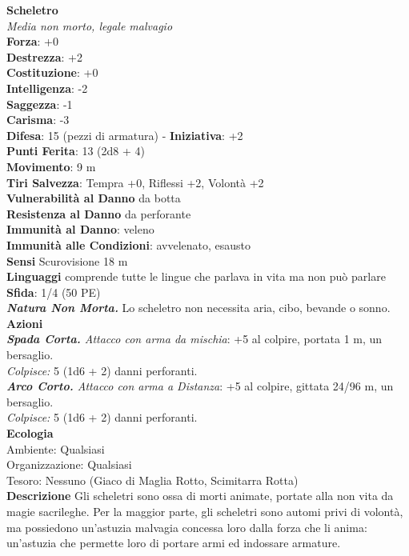 \begin{multicols}{2}
\medskip\textbf{Scheletro}\\
\emph{Media non morto, legale malvagio}\\
\textbf{Forza}: +0\\
\textbf{Destrezza}: +2\\
\textbf{Costituzione}: +0\\
\textbf{Intelligenza}: -2\\
\textbf{Saggezza}: -1\\
\textbf{Carisma}: -3\\
\textbf{Difesa}: 15 (pezzi di armatura) - \textbf{Iniziativa}: +2\\
\textbf{Punti Ferita}: 13 (2d8 + 4)\\
\textbf{Movimento}: 9 m\\
\textbf{Tiri Salvezza}: Tempra +0, Riflessi +2, Volontà +2\\
\textbf{Vulnerabilità al Danno} da botta\\
\textbf{Resistenza al Danno} da perforante\\
\textbf{Immunità al Danno}: veleno\\
\textbf{Immunità alle Condizioni}: avvelenato, esausto\\
\textbf{Sensi} Scurovisione 18 m\\
\textbf{Linguaggi} comprende tutte le lingue che parlava in vita ma non può parlare\\
\textbf{Sfida}: 1/4 (50 PE)\smallskip\\
\emph{\textbf{Natura Non Morta.}} Lo scheletro non necessita aria, cibo, bevande o sonno.\\
\smallskip\textbf{Azioni}\\
\emph{\textbf{Spada Corta.} Attacco con arma da mischia}: +5 al colpire, portata 1 m, un bersaglio.\\
\emph{Colpisce:} 5 (1d6 + 2) danni perforanti.\\
\emph{\textbf{Arco Corto.} Attacco con arma a Distanza}: +5 al colpire, gittata 24/96 m, un bersaglio.\\
\emph{Colpisce:} 5 (1d6 + 2) danni perforanti.\\
\textbf{Ecologia}\\
Ambiente: Qualsiasi\\
Organizzazione: Qualsiasi\\
Tesoro: Nessuno (Giaco di Maglia Rotto, Scimitarra Rotta)\\
\textbf{Descrizione}
Gli scheletri sono ossa di morti animate, portate alla non vita da magie sacrileghe. Per la maggior parte, gli scheletri sono automi privi di volontà, ma possiedono un'astuzia malvagia concessa loro dalla forza che li anima: un'astuzia che permette loro di portare armi ed indossare armature.\\



\end{multicols}
